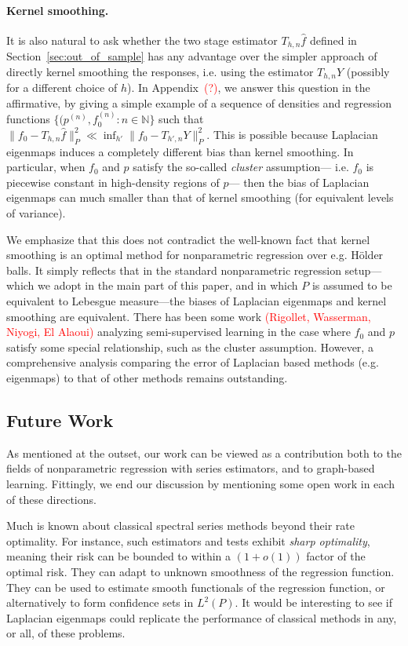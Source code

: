 \documentclass{article}
\newcommand{\1}{\mathbf{1}}
\newcommand{\wh}[1]{\widehat{#1}}
\theoremstyle{alden}
\theoremstyle{aldenthm}
\theoremstyle{definition}
\theoremstyle{remark}
\begin{document}
\paragraph{Kernel smoothing.}
It is also natural to ask whether the two stage estimator $T_{h,n}\wh{f}$ defined in Section~\ref{sec:out_of_sample} has any advantage over the simpler approach of directly kernel smoothing the responses, i.e. using the estimator $T_{h,n}Y$ (possibly for a different choice of $h$). In Appendix~\textcolor{red}{(?)}, we answer this question in the affirmative, by giving a simple example of a sequence of densities and regression functions $\{(p^{(n)}, f_0^{(n)}: n \in \mathbb{N}\}$ such that $\|f_0 - T_{h,n}\wh{f}\|_P^2 \ll \inf_{h'} \|f_0 - T_{h',n}Y\|_P^2$. This is possible because Laplacian eigenmaps induces a completely different bias than kernel smoothing. In particular, when $f_0$ and $p$ satisfy the so-called \emph{cluster} assumption--- i.e. $f_0$ is piecewise constant in high-density regions of $p$--- then the bias of Laplacian eigenmaps can much smaller than that of kernel smoothing (for equivalent levels of variance). 

We emphasize that this does not contradict the well-known fact that kernel smoothing is an optimal method for nonparametric regression over e.g. H\"{o}lder balls. It simply reflects that in the standard nonparametric regression setup---which we adopt in the main part of this paper, and in which $P$ is assumed to be equivalent to Lebesgue measure---the biases of Laplacian eigenmaps and kernel smoothing are equivalent. There has been some work \textcolor{red}{(Rigollet, Wasserman, Niyogi, El Alaoui)} analyzing semi-supervised learning in the case where $f_0$ and $p$ satisfy some special relationship, such as the cluster assumption. However, a comprehensive analysis comparing the error of Laplacian based methods (e.g. eigenmaps) to that of other methods remains outstanding.

\subsection{Future Work}
As mentioned at the outset, our work can be viewed as a contribution both to the fields of nonparametric regression with series estimators, and to graph-based learning. Fittingly, we end our discussion by mentioning some open work in each of these directions. 

Much is known about classical spectral series methods beyond their rate optimality. For instance, such estimators and tests exhibit \emph{sharp optimality}, meaning their risk can be bounded to within a $(1 + o(1))$ factor of the optimal risk. They can adapt to unknown smoothness of the regression function. They can be used to estimate smooth functionals of the regression function, or alternatively to form confidence sets in $L^2(P)$. It would be interesting to see if Laplacian eigenmaps could replicate the performance of classical methods in any, or all, of these problems.
\end{document}
